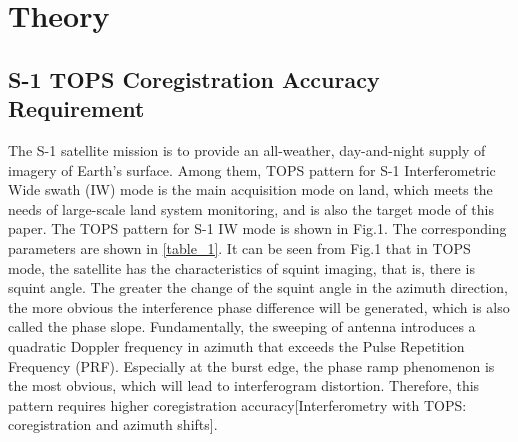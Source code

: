 \documentclass[a4paper,fleqn]{cas-dc}
\begin{document}






\section{Theory}\label{Theory}
\subsection{S-1 TOPS Coregistration Accuracy Requirement}
The S-1 satellite mission is to provide an all-weather, day-and-night supply of imagery of Earth’s surface. Among them, TOPS pattern for S-1 Interferometric Wide swath (IW) mode is the main acquisition mode on land, which meets the needs of large-scale land system monitoring, and is also the target mode of this paper. The TOPS pattern for S-1 IW mode is shown in Fig.1. The corresponding parameters are shown in \ref{table_1}. It can be seen from Fig.1 that in TOPS mode, the satellite has the characteristics of squint imaging, that is, there is squint angle. The greater the change of the squint angle in the azimuth direction, the more obvious the interference phase difference will be generated, which is also called the phase slope. Fundamentally, the sweeping of antenna introduces a quadratic Doppler frequency in azimuth that exceeds the Pulse Repetition Frequency (PRF). Especially at the burst edge, the phase ramp phenomenon is the most obvious, which will lead to interferogram distortion. Therefore, this pattern requires higher coregistration accuracy[Interferometry with TOPS: coregistration and azimuth shifts]. \par
\end{document}
